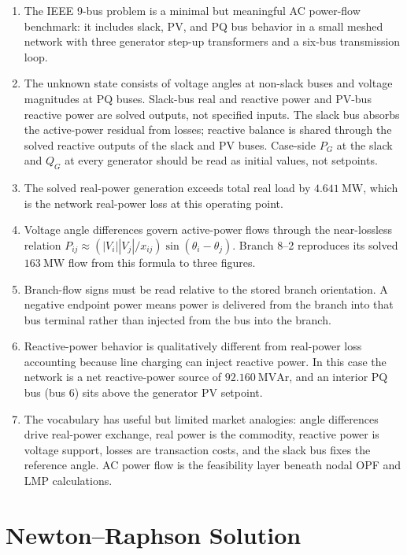 \documentclass[11pt]{article}
\newcommand{\MW}{\mathrm{MW}}
\newcommand{\MVAr}{\mathrm{MVAr}}
\begin{document}
\begin{enumerate}
  \item The IEEE 9-bus problem is a minimal but meaningful AC power-flow
  benchmark: it includes slack, PV, and PQ bus behavior in a small meshed
  network with three generator step-up transformers and a six-bus
  transmission loop.
  \item The unknown state consists of voltage angles at non-slack buses
  and voltage magnitudes at PQ buses. Slack-bus real and reactive power
  and PV-bus reactive power are solved outputs, not specified inputs.
  The slack bus absorbs the active-power residual from losses; reactive
  balance is shared through the solved reactive outputs of the slack and
  PV buses. Case-side $P_G$ at the slack and $Q_G$ at every generator
  should be read as initial values, not setpoints.
  \item The solved real-power generation exceeds total real load by
  $4.641~\MW$, which is the network real-power loss at this operating
  point.
  \item Voltage angle differences govern active-power flows through the
  near-lossless relation $P_{ij} \approx (|V_i||V_j|/x_{ij})
  \sin(\theta_i - \theta_j)$. Branch 8--2 reproduces its solved
  $163~\MW$ flow from this formula to three figures.
  \item Branch-flow signs must be read relative to the stored branch
  orientation. A negative endpoint power means power is delivered from
  the branch into that bus terminal rather than injected from the bus
  into the branch.
  \item Reactive-power behavior is qualitatively different from
  real-power loss accounting because line charging can inject reactive
  power. In this case the network is a net reactive-power source of
  $92.160~\MVAr$, and an interior PQ bus (bus 6) sits above the generator
  PV setpoint.
  \item The vocabulary has useful but limited market analogies:
  angle differences drive real-power exchange, real power is the
  commodity, reactive power is voltage support, losses are transaction
  costs, and the slack bus fixes the reference angle. AC power flow is
  the feasibility layer beneath nodal OPF and LMP calculations.
\end{enumerate}

\appendix

\section{Newton--Raphson Solution}\label{app:newton}
\end{document}

